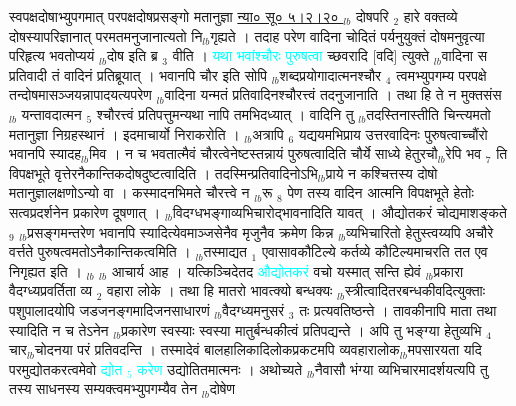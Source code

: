 \documentclass[article,12pt,a4paper]{memoir}%
\newcommand{\quotelemma}[1]{\textcolor{cyan}{#1}}
\begin{document}
	  
	  \pstart \leavevmode%
	\hphantom{.}स्वपक्षदोषाभ्युपगमात् परपक्षदोषप्रसङ्गो मतानुज्ञा \href{http://sarit.indology.info/?cref=ns\%C5\%AB.5.2.20}{न्या० सू० ५।२।२० } {\tiny $_{lb}$} \cite[18b3]{vn-msN} दोषपरि {\tiny $_{2}$} हारे वक्तव्ये दोषस्यापरिज्ञानात् परमतमनुजानात्यतो नि{\tiny $_{lb}$}गृह्यते । तदाह परेण वादिना चोदितं पर्यनुयुक्तं दोषमनुवृत्या परिहृत्य भवतोप्ययं {\tiny $_{lb}$}दोष इति ब्र {\tiny $_{3}$} वीति । \quotelemma{यथा भवांश्चौरः पुरुषत्वा} \cite[16b4]{vn-msN} च्छवरादि [वदि] त्युक्ते {\tiny $_{lb}$}वादिना स प्रतिवादी तं वादिनं प्रतिब्रूयात् । भवानपि चौर इति सोपि {\tiny $_{lb}$}शब्दप्रयोगादात्मनश्चौर {\tiny $_{4}$} त्वमभ्युपगम्य परपक्षे तन्दोषमासञ्जयन्नापादयत्यपरेण {\tiny $_{lb}$}वादिना यन्मतं प्रतिवादिनश्चौरत्त्वं तदनुजानाति । तथा हि ते न मुक्तसंस {\tiny $_{lb}$} यन्तावदात्मन {\tiny $_{5}$} श्चौरत्त्वं प्रतिपत्तुमन्यथा नापि तमभिदध्यात् । वादिनि तु {\tiny $_{lb}$}तदस्तिनास्तीति चिन्त्यमतो मतानुज्ञा निग्रहस्थानं । इदमाचार्यो निराकरोति । {\tiny $_{lb}$}अत्रापि {\tiny $_{6}$} \cite[18b5]{vn-msN} यद्ययमभिप्राय उत्तरवादिनः पुरुषत्वाच्चौंरो भवानपि स्यादह{\tiny $_{lb}$}मिव । न च भवतात्मैवं चौरत्वेनेष्टस्तन्नायं पुरुषत्वादिति चौर्ये साध्ये हेतुरचौ{\tiny $_{lb}$}रेपि भव {\tiny $_{7}$} ति विपक्षभूते वृत्तेरनैकान्तिकदोषदुष्टत्वादिति । तदस्मिन्प्रतिवादिनोऽभि{\tiny $_{lb}$}प्राये न कश्चित्तस्य दोषो मतानुज्ञालक्षणोऽन्यो वा । कस्मादनभिमते चौरत्त्वे न {\tiny $_{lb}$}रू {\tiny $_{8}$} पेण तस्य वादिन आत्मनि विपक्षभूते हेतोः सत्वप्रदर्शनेन प्रकारेण दूषणात् । {\tiny $_{lb}$}विदग्धभङ्गाव्यभिचारोद्भावनादिति यावत् । औद्योतकरं चोद्यमाशङ्कते {\tiny $_{9}$} \leavevmode{} {\tiny $_{lb}$}प्रसङ्गमन्तरेण भवानपि स्यादित्येवमाञ्जसेनैव मृजुनैव क्रमेण किन्न {\tiny $_{lb}$}व्यभिचारितो हेतुस्त्वय्यपि अचौरे वर्त्तते पुरुषत्वमतोऽनैकान्तिकत्वमिति । {\tiny $_{lb}$}तस्माद्यत {\tiny $_{1}$} एवासावकौटिल्ये कर्तव्ये कौटिल्यमाचरति तत एव निगृह्यत इति । {\tiny $_{lb}$}  {\tiny $_{lb}$} \leavevmode{} आचार्य आह । यत्किञ्चिदेतद \cite[18b6]{vn-msN} \quotelemma{औद्योतकरं} वचो यस्मात् सन्ति ह्येवं {\tiny $_{lb}$}प्रकारा वैदग्ध्यप्रवर्तिता व्य {\tiny $_{2}$} वहारा लोके । तथा हि मातरो भावत्क्यो बन्धक्यः {\tiny $_{lb}$}स्त्रीत्वादितरबन्धकीवदित्युक्ताः पशुपालादयोपि जडजनङ्गमादिजनसाधारणं {\tiny $_{lb}$}वैदग्ध्यमनुसरं {\tiny $_{3}$} तः प्रत्यवतिष्ठन्ते । तावकीनापि माता तथा स्यादिति न च तेऽनेन {\tiny $_{lb}$}प्रकारेण स्वस्याः स्वस्या मातुर्बन्धकीत्वं प्रतिपद्यन्ते । अपि तु भङ्ग्या हेतुव्यभि {\tiny $_{4}$} चार{\tiny $_{lb}$}चोदनया परं प्रतिवदन्ति । तस्मादेवं बालहालिकादिलोकप्रकटमपि व्यवहारालोक{\tiny $_{lb}$}मपसारयता यदि परमुद्योतकरत्वमेवो \quotelemma{द्योत {\tiny $_{5}$} करेण} उद्योतितमात्मनः । अथोच्यते {\tiny $_{lb}$}नैवासौ भंग्या व्यभिचारमादर्शयत्यपि तु तस्य साधनस्य सम्यक्त्वमभ्युपगम्यैव तेन {\tiny $_{lb}$}दोषेण 
\end{document}
